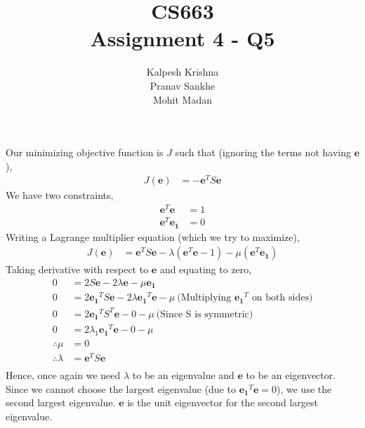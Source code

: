 \documentclass[11pt]{article}
\title{\textbf{CS663 \\ Assignment 4 - Q5}}
\author{Kalpesh Krishna\\ Pranav Sankhe \\ Mohit Madan}
\date{}
\newcommand{\evector}{\boldsymbol{e}}
\newcommand{\evone}{\boldsymbol{e_1}}
\begin{document}
\maketitle
Our minimizing objective function is $J$ such that (ignoring the terms not having $\evector$),
\begin{align*}
J(\evector) &= -\evector^T S \evector
\end{align*}
We have two constraints,
\begin{align*}
\evector ^T \evector &= 1 \\
\evector ^T \evone &= 0
\end{align*}
Writing a Lagrange multiplier equation (which we try to maximize),
\begin{align*}
J(\evector) &= \evector^T S \evector - \lambda (\evector ^T \evector - 1) - \mu (\evector ^T \evone)
\end{align*}
Taking derivative with respect to $\evector$ and equating to zero,
\begin{align*}
0 &= 2 S \evector - 2\lambda \evector - \mu \evone\\
0 &= 2\evone^T S \evector - 2\lambda \evone^T \evector - \mu~\text{(Multiplying $\evone^T$ on both sides)}\\
0 &= 2 \evone^T S^T \evector - 0 - \mu~\text{(Since S is symmetric)}\\
0 &= 2\lambda_1 \evone^T \evector - 0 - \mu\\
\therefore\mu &= 0 \\
\therefore \lambda &= \evector^T S \evector\\
\end{align*}
Hence, once again we need $\lambda$ to be an eigenvalue and $\evector$ to be an eigenvector. Since we cannot choose the largest eigenvalue (due to $\evone^T \evector = 0$), we use the second largest eigenvalue. $\evector$ is the unit eigenvector for the second largest eigenvalue.
\end{document}
